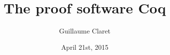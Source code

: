 \documentclass[hyperref={pdfpagelabels=false}]{beamer}
\begin{document}
\title{The proof software Coq}
\author{Guillaume Claret}
\date{April 21st, 2015}
\maketitle




\end{document}
